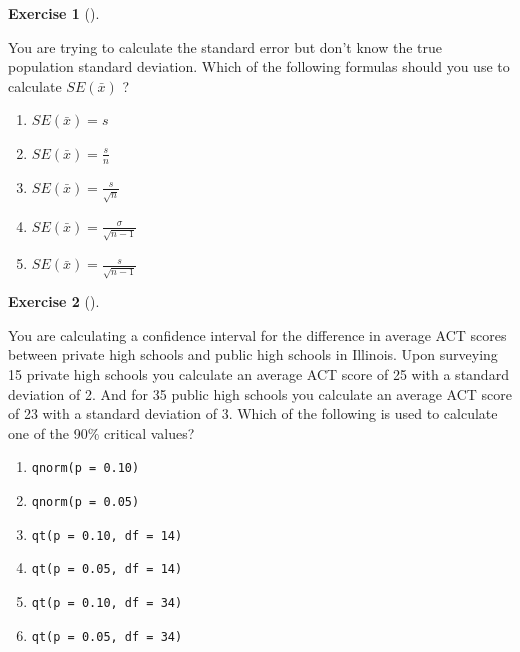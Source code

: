 \documentclass[
  letterpaper,
  DIV=11,
  numbers=noendperiod]{scrreprt}
\providecommand{\tightlist}{%
  \setlength{\itemsep}{0pt}\setlength{\parskip}{0pt}}\usepackage{longtable,booktabs,array}
\theoremstyle{definition}
\newtheorem{exercise}{Exercise}[chapter]
\theoremstyle{remark}
\begin{document}
\begin{exercise}[]\protect\hypertarget{exr-ch10-c06}{}\label{exr-ch10-c06}

You are trying to calculate the standard error but don't know the true
population standard deviation. Which of the following formulas should
you use to calculate \(SE(\bar{x})\) ?

\begin{enumerate}
\def\labelenumi{\alph{enumi})}
\tightlist
\item
  \(SE(\bar{x}) = s\)
\item
  \(SE(\bar{x}) = \frac{s}{n}\)
\item
  \(SE(\bar{x}) = \frac{s}{\sqrt{n}}\)
\item
  \(SE(\bar{x}) = \frac{\sigma}{\sqrt{n-1}}\)
\item
  \(SE(\bar{x}) = \frac{s}{\sqrt{n-1}}\)
\end{enumerate}

\end{exercise}

\begin{exercise}[]\protect\hypertarget{exr-ch10-c07}{}\label{exr-ch10-c07}

You are calculating a confidence interval for the difference in average
ACT scores between private high schools and public high schools in
Illinois. Upon surveying 15 private high schools you calculate an
average ACT score of 25 with a standard deviation of 2. And for 35
public high schools you calculate an average ACT score of 23 with a
standard deviation of 3. Which of the following is used to calculate one
of the 90\% critical values?

\begin{enumerate}
\def\labelenumi{\alph{enumi})}
\tightlist
\item
  \texttt{qnorm(p\ =\ 0.10)}
\item
  \texttt{qnorm(p\ =\ 0.05)}
\item
  \texttt{qt(p\ =\ 0.10,\ df\ =\ 14)}
\item
  \texttt{qt(p\ =\ 0.05,\ df\ =\ 14)}
\item
  \texttt{qt(p\ =\ 0.10,\ df\ =\ 34)}
\item
  \texttt{qt(p\ =\ 0.05,\ df\ =\ 34)}
\end{enumerate}

\end{exercise}
\end{document}
